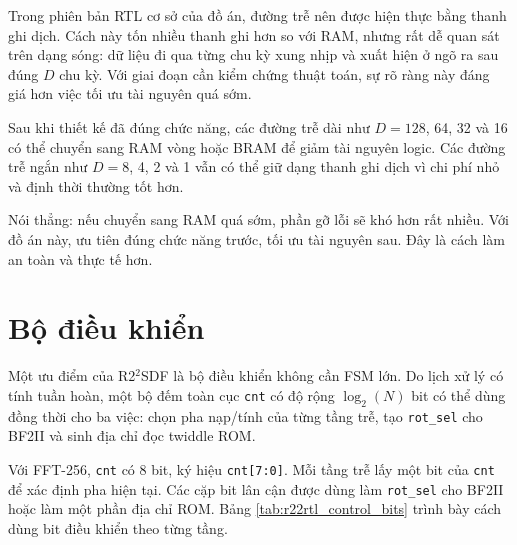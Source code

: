 \documentclass[12pt,a4paper]{report}
\numberwithin{equation}{chapter}
\begin{document}
Trong phiên bản RTL cơ sở của đồ án, đường trễ nên được hiện thực bằng thanh ghi dịch. Cách này tốn nhiều thanh ghi hơn so với RAM, nhưng rất dễ quan sát trên dạng sóng: dữ liệu đi qua từng chu kỳ xung nhịp và xuất hiện ở ngõ ra sau đúng $D$ chu kỳ. Với giai đoạn cần kiểm chứng thuật toán, sự rõ ràng này đáng giá hơn việc tối ưu tài nguyên quá sớm.

Sau khi thiết kế đã đúng chức năng, các đường trễ dài như $D=128$, 64, 32 và 16 có thể chuyển sang RAM vòng hoặc BRAM để giảm tài nguyên logic. Các đường trễ ngắn như $D=8$, 4, 2 và 1 vẫn có thể giữ dạng thanh ghi dịch vì chi phí nhỏ và định thời thường tốt hơn.

Nói thẳng: nếu chuyển sang RAM quá sớm, phần gỡ lỗi sẽ khó hơn rất nhiều. Với đồ án này, ưu tiên đúng chức năng trước, tối ưu tài nguyên sau. Đây là cách làm an toàn và thực tế hơn.

\section{Bộ điều khiển}
\label{sec:r22rtl_control_unit}

Một ưu điểm của R2$^2$SDF là bộ điều khiển không cần FSM lớn. Do lịch xử lý có tính tuần hoàn, một bộ đếm toàn cục \texttt{cnt} có độ rộng $\log_2(N)$ bit có thể dùng đồng thời cho ba việc: chọn pha nạp/tính của từng tầng trễ, tạo \texttt{rot\_sel} cho BF2II và sinh địa chỉ đọc twiddle ROM.

Với FFT-256, \texttt{cnt} có 8 bit, ký hiệu \texttt{cnt[7:0]}. Mỗi tầng trễ lấy một bit của \texttt{cnt} để xác định pha hiện tại. Các cặp bit lân cận được dùng làm \texttt{rot\_sel} cho BF2II hoặc làm một phần địa chỉ ROM. Bảng \ref{tab:r22rtl_control_bits} trình bày cách dùng bit điều khiển theo từng tầng.
\end{document}
